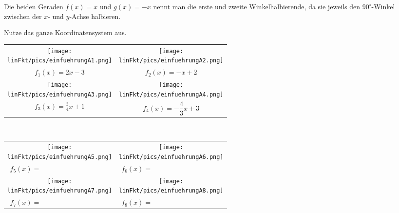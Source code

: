 \medskip

Die beiden Geraden \(f(x)=x\) und \(g(x)=-x\) nennt man die erste und zweite Winkelhalbierende, da sie jeweils den \(90^\circ\)-Winkel zwischen der \(x\)- und \(y\)-Achse halbieren.
\newpage
\begin{Exercise}[title={Zeichne das Schaubild der folgenden Funktionen}, label=lineareFktEinfuehrungA1]

	Nutze das ganze Koordinatensystem aus.

	\begin{minipage}[t]{\textwidth}
		\begin{tabular}{cc}
			\centering
			\texttt{[image: \\linFkt/pics/einfuehrungA1.png]}&\texttt{[image: \\linFkt/pics/einfuehrungA2.png]}\\
			\(f_1(x)=2x-3\)&	\(f_2(x)=-x+2\)\\ \addlinespace[20pt]
			\texttt{[image: \\linFkt/pics/einfuehrungA3.png]}&\texttt{[image: \\linFkt/pics/einfuehrungA4.png]}\\
			\(f_3(x)=\frac{3}{4}x+1\)&	\(f_4(x)=-\dfrac{4}{3}x+3\)
		\end{tabular}
\end{minipage}
\end{Exercise}
\newpage
\begin{Exercise}[title={Bestimme die Funktionsgleichung}, label=lineareFktEinfuehrungA2]\\
	\begin{minipage}[t]{\textwidth}
		\begin{tabular}{cc}
			\centering
			\texttt{[image: \\linFkt/pics/einfuehrungA5.png]}&\texttt{[image: \\linFkt/pics/einfuehrungA6.png]}  \\
			\(f_5(x)=\qquad\qquad\qquad\qquad\qquad\)&	\(f_6(x)=\qquad\qquad\qquad\qquad\qquad\)  \\ \addlinespace[20pt]
			\texttt{[image: \\linFkt/pics/einfuehrungA7.png]}&\texttt{[image: \\linFkt/pics/einfuehrungA8.png]}  \\
			\(f_7(x)=\qquad\qquad\qquad\qquad\qquad\)&	\(f_8(x)=\qquad\qquad\qquad\qquad\qquad\)  \\
		\end{tabular}
\end{minipage}
\end{Exercise}
\newpage
